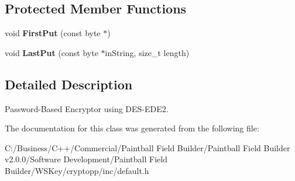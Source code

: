 \subsection*{Protected Member Functions}
\begin{DoxyCompactItemize}
\item 
\hypertarget{class_default_encryptor_a0d4a29cb66bdce3360a2233fa916cb99}{
void {\bfseries FirstPut} (const byte $\ast$)}
\label{class_default_encryptor_a0d4a29cb66bdce3360a2233fa916cb99}

\item 
\hypertarget{class_default_encryptor_ad40665647f5693f8350fc9b9375ca078}{
void {\bfseries LastPut} (const byte $\ast$inString, size\_\-t length)}
\label{class_default_encryptor_ad40665647f5693f8350fc9b9375ca078}

\end{DoxyCompactItemize}


\subsection{Detailed Description}
Password-\/Based Encryptor using DES-\/EDE2. 

The documentation for this class was generated from the following file:\begin{DoxyCompactItemize}
\item 
C:/Business/C++/Commercial/Paintball Field Builder/Paintball Field Builder v2.0.0/Software Development/Paintball Field Builder/WSKey/cryptopp/inc/default.h\end{DoxyCompactItemize}
